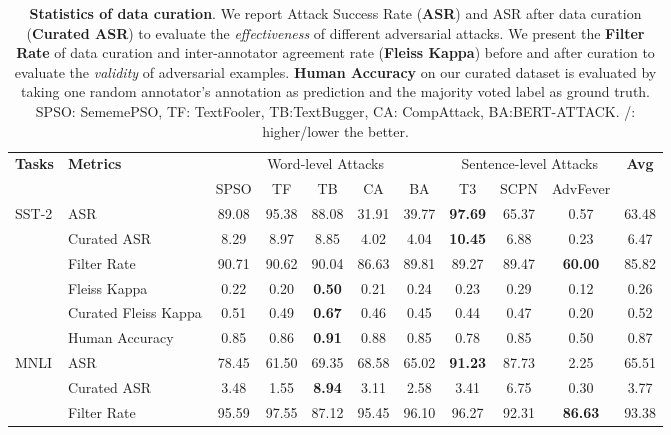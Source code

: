 \documentclass{article}
\begin{document}
\begin{table}[t]
\small
\centering
    \caption{\small \textbf{Statistics of data curation}. We report  Attack Success Rate (\textbf{ASR}) and  ASR after data curation (\textbf{Curated ASR}) to evaluate the \textit{effectiveness} of different adversarial attacks. We  present the \textbf{Filter Rate} of data curation and inter-annotator agreement rate (\textbf{Fleiss Kappa}) before and after curation to evaluate the \textit{validity} of adversarial examples. \textbf{Human Accuracy} on our curated dataset is evaluated by taking one random annotator's annotation as prediction and the majority voted label as ground truth. SPSO: SememePSO, TF: TextFooler, TB:TextBugger, CA: CompAttack, BA:BERT-ATTACK. /: higher/lower the better.}
    \label{tab:curation}
{
{
\setlength{\tabcolsep}{3.75pt}
    \begin{tabular}{ll|cccccccc|c}
    \toprule
         \multirow{2}{*}{\textbf{Tasks}} & \multirow{2}{*}{\textbf{Metrics}} & \multicolumn{5}{c}{Word-level Attacks} & \multicolumn{3}{c|}{Sentence-level Attacks} & \multirow{2}{*}{\textbf{Avg}} \\
         \cmidrule(lr){3-7} \cmidrule(lr){8-10}
         & & SPSO & TF & TB & CA &  BA & T3 & SCPN & AdvFever &    \\
        \midrule
          \multirow{6}{*}{SST-2} & ASR  & 89.08 & 95.38 & 88.08 & 31.91 & 39.77 & \textbf{97.69} & 65.37 & 0.57 & 63.48 \\
           & Curated ASR  & 8.29 & 8.97 & 8.85 & 4.02 & 4.04 & \textbf{10.45} & 6.88 & 0.23 & 6.47 \\
           & Filter Rate  & 90.71 & 90.62 & 90.04 & 86.63 & 89.81 & 89.27 & 89.47 & \textbf{60.00} & 85.82 \\
           & Fleiss Kappa   & 0.22 & 0.20 & \textbf{0.50} & 0.21 & 0.24 & 0.23 & 0.29 & 0.12 & 0.26 \\
           & Curated Fleiss Kappa   & 0.51 & 0.49 & \textbf{0.67} & 0.46 & 0.45 & 0.44 & 0.47 & 0.20 & 0.52 \\
           & Human Accuracy  & 0.85 & 0.86 & \textbf{0.91} & 0.88 & 0.85 & 0.78 & 0.85 & 0.50 & 0.87 \\
           \midrule
           \multirow{6}{*}{MNLI} & ASR  & 78.45 & 61.50 & 69.35 & 68.58 & 65.02 & \textbf{91.23} & 87.73 & 2.25 & 65.51 \\
           & Curated ASR  & 3.48 & 1.55 & \textbf{8.94} & 3.11 & 2.58 & 3.41 & 6.75 & 0.30 & 3.77 \\
           & Filter Rate  & 95.59 & 97.55 & 87.12 & 95.45 & 96.10 & 96.27 & 92.31 & \textbf{86.63} & 93.38 \\

\end{tabular}}}
\end{table}
\end{document}
